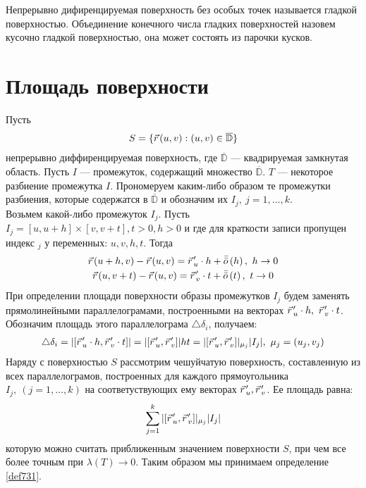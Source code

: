 \begin{definition}
  Непрерывно дифиренцируемая поверхность без особых точек называется гладкой
  поверхностью. Объединение конечного числа гладких поверхностей назовем
  кусочно гладкой поверхностью, она может состоять из парочки кусков.
\end{definition}

\section{Площадь поверхности}
Пусть
\begin{gather}
  S = \{\pvec r(u, v) : (u, v) \in \overline{\mathbb{D}}\}
  \label{ch73:eq1}
\end{gather}
непрерывно диффиренцируемая поверхность, где $\overline{\mathbb{D}}$ ---
квадрируемая замкнутая область. Пусть $I$ --- промежуток, содержащий множество
$\overline{\mathbb{D}}$. $T$ --- некоторое разбиение промежутка $I$.
Прономеруем каким-либо образом те промежутки разбиения, которые содержатся в
$\overline{\mathbb{D}}$ и обозначим их $I_j, \ j = 1, \dots, k$. \\ Возьмем
какой-либо промежуток $I_j$.
Пусть $I_j = [u, u + h] \times [v, v + t], t > 0,
h > 0$ и где для краткости записи пропущен индекс ${}_j$ у переменных: $u, v, h,
t$. Тогда
\begin{gather*}
  \pvec r(u + h, v) - \pvec r(u, v) = \pvec r_u' \cdot h +
  \bar{\bar{o}}\left(h\right), \ h \to 0 \\
  \pvec r(u, v + t) - \pvec r(u, v) = \pvec r_v' \cdot t +
  \bar{\bar{o}}\left(t\right), \ t \to 0
\end{gather*}
При определении площади поверхности образы промежутков $I_j$ будем заменять
прямолинейными параллелограмами, построенными на векторах $\pvec r_u' \cdot h,
\ \pvec r_v' \cdot t$. Обозначим площадь этого параллелограма
$\triangle\delta_i$, получаем:
\begin{gather*}
  \triangle \delta_i = |[\pvec r_u' \cdot h, \pvec r_v' \cdot t]| = |[\pvec
  r_u', \pvec r_v']| ht = |[\pvec r_u', \pvec r_v']|_{\mu_j}|I_j|, \ \mu_j =
  (u_j, v_j)
\end{gather*}
Наряду с поверхностью $S$ рассмотрим чешуйчатую поверхность, составленную из
всех параллелограмов, построенных для каждого прямоугольника $I_j, \ (j = 1,
\dots, k)$ на соответуствующих ему векторах $\pvec r_u', \pvec r_v'$. Ее
площадь равна:
\begin{gather*}
  \sum\limits_{j = 1}^{k} |[\pvec r_u', \pvec r_v']|_{\mu_j}|I_j|
\end{gather*}
которую можно считать приближенным значением поверхности $S$, при чем все более
точным при $\lambda(T) \to 0$. Таким образом мы принимаем определение
\eqref{def731}.

